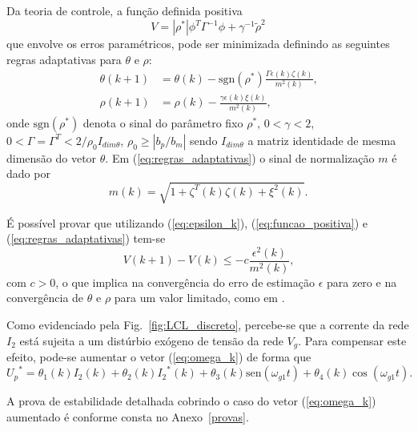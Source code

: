     Da teoria de controle, a função definida positiva
    \begin{equation}
        V = |\rho^*| \phi^T \Gamma^{-1} \phi + \gamma^{-1} {\tilde{\rho}}^2
        \label{eq:funcao_positiva}
    \end{equation}
    que envolve os erros paramétricos, pode ser minimizada definindo as seguintes regras adaptativas para $\theta$ e $\rho$:
    \begin{subequations}
        \begin{align}
            \theta(k + 1) & = \theta(k) - \text{sgn}(\rho^*)\frac{\Gamma \epsilon(k)\zeta(k)}{m^2(k)} \text{,}\\
            \rho(k + 1) & = \rho(k) - \frac{\gamma \epsilon(k) \xi(k)}{m^2(k)} \text{,}
        \end{align}
        \label{eq:regras_adaptativas}
    \end{subequations}
    onde $\text{sgn}(\rho^*)$ denota o sinal do parâmetro fixo $\rho^*$, $0 < \gamma < 2$, $0 < \Gamma = \Gamma^T < 2/\rho_0 I_{dim \theta}$, $\rho_0 \geq |b_p / b_m|$ sendo $I_{dim \theta}$ a matriz identidade de mesma dimensão do vetor $\theta$. Em (\ref{eq:regras_adaptativas}) o sinal de normalização $m$ é dado por
    \begin{equation}
        m(k) = \sqrt{1 + \zeta^T(k) \zeta(k) + \xi^2(k)} \text{.}
    \end{equation}

    É possível provar que utilizando (\ref{eq:epsilon_k}), (\ref{eq:funcao_positiva}) e (\ref{eq:regras_adaptativas}) tem-se
    \begin{equation}
        V(k + 1) - V(k) \leq -c \frac{\epsilon^2(k)}{m^2(k)} \text{,}
    \end{equation}
    com $c > 0$, o que implica na convergência do erro de estimação $\epsilon$ para zero e na convergência de $\theta$ e $\rho$ para um valor limitado, como em \cite{ref:TAO}.

    Como evidenciado pela Fig.~\ref{fig:LCL_discreto}, percebe-se que a corrente da rede $I_2$ está sujeita a um distúrbio exógeno de tensão da rede $V_g$. Para compensar este efeito, pode-se aumentar o vetor (\ref{eq:omega_k}) de forma que
    \begin{equation}
        {U_p}^* = \theta_1(k) I_2(k) + \theta_2(k) {I_2}^*(k)+
            \theta_3(k) \text{sen}(\omega_{g1}t) + \theta_4(k) \cos(\omega_{g1} t) \text{.}
    \end{equation}

    A prova de estabilidade detalhada cobrindo o caso do vetor (\ref{eq:omega_k}) aumentado é conforme consta no Anexo~\ref{provas}.



